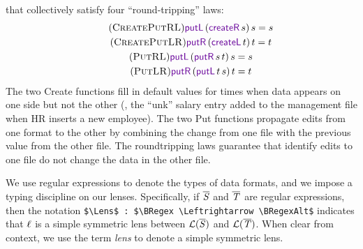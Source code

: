 \documentclass[acmsmall,screen,anonymous]{acmart}
\begin{document}
\noindent
that collectively satisfy four ``round-tripping'' laws: 
\begin{gather}
  \tag{\CreatePutRL}
  \PutLOf{(\CreateROf{s})}{s} = s\\
  \tag{\CreatePutLR}
  \PutROf{(\CreateLOf{t})}{t} = t\\
  \tag{\PutRL}
  \PutLOf{(\PutROf{s}{t})}{s} = s\\
  \tag{\PutLR}
  \PutROf{(\PutLOf{t}{s})}{t} = t
\end{gather}
\noindent
The two {\sc Create} functions fill in default values for times when
data appears on one side but not the other (\EG, the ``unk'' salary
entry added to the management file when HR inserts a new employee).
The two {\sc Put} functions propagate edits from one format to the
other by combining the change from one file with the previous value
from the other file. The roundtripping laws guarantee that identify
edits to one file do
not change the data in the other file. 



We use regular expressions to denote the types of data formats, and we
impose a typing discipline on our lenses.  Specifically, if 
$\overline{\mathit{S}}$ and $\overline{\mathit{T}}$ are regular expressions, then the notation
\lstinline{$\Lens$ : $\BRegex \Leftrightarrow \BRegexAlt$} indicates that $\mathit{\ell}$
is a simple symmetric lens between $\mathcal{L}(\overline{\mathit{S}})$ and
$\mathcal{L}(\overline{\mathit{T}})$. 
When clear from context, we use the term \textit{lens} to denote a
simple symmetric lens.
\end{document}
